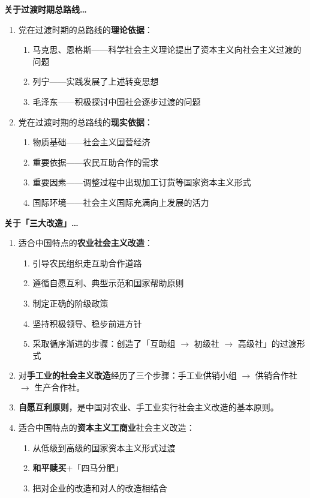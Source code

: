 \documentclass[UTF8]{ctexart}
\newcommand\Emph[2]{\colorbox{c#1-light}{\textcolor{c#1-emph}{\textbf{#2}}}}
\begin{document}
\begin{mybox}{3}
\textbf{关于过渡时期总路线…}
\begin{enumerate}
  \item 党在过渡时期的总路线的\Emph{3}{理论依据}：
  \begin{enumerate}[label={\roman{enumii})}, start=1]
    \item 马克思、恩格斯——科学社会主义理论提出了资本主义向社会主义过渡的问题
    \item 列宁——实践发展了上述转变思想
    \item 毛泽东——积极探讨中国社会逐步过渡的问题
  \end{enumerate}
  \item 党在过渡时期的总路线的\Emph{3}{现实依据}：
  \begin{enumerate}[label={\roman{enumii})}, start=1]
    \item 物质基础——社会主义国营经济
    \item 重要依据——农民互助合作的需求
    \item 重要因素——调整过程中出现加工订货等国家资本主义形式
    \item 国际环境——社会主义国际充满向上发展的活力
  \end{enumerate}
\end{enumerate}
\end{mybox}

\begin{mybox}{3}
\textbf{关于「三大改造」…}
\begin{enumerate}[start=7]
  \item 适合中国特点的\Emph{3}{农业社会主义改造}：
  \begin{enumerate}[label={\roman{enumii})}, start=1]
    \item 引导农民组织走互助合作道路
    \item 遵循自愿互利、典型示范和国家帮助原则
    \item 制定正确的阶级政策
    \item 坚持积极领导、稳步前进方针
    \item 采取循序渐进的步骤：创造了「互助组 $\to$ 初级社 $\to$ 高级社」的过渡形式
  \end{enumerate}
  \item 对\Emph{3}{手工业的社会主义改造}经历了三个步骤：手工业供销小组 $\to$ 供销合作社 $\to$ 生产合作社。
  \item \Emph{3}{自愿互利原则}，是中国对农业、手工业实行社会主义改造的基本原则。
  \item 适合中国特点的\Emph{3}{资本主义工商业}社会主义改造：
  \begin{enumerate}[label={\roman{enumii})}, start=1]
    \item 从低级到高级的国家资本主义形式过渡
    \item \Emph{3}{和平赎买}+「四马分肥」
    \item 把对企业的改造和对人的改造相结合
  \end{enumerate}
\end{enumerate}
\end{mybox}
\end{document}
